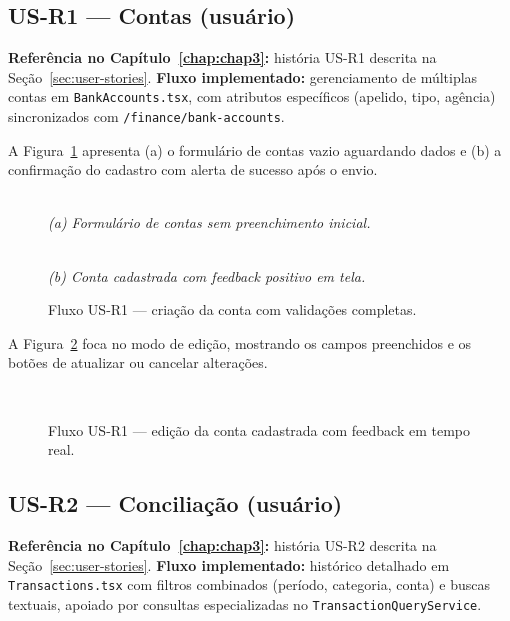 \FloatBarrier

\subsection{US-R1 — Contas (usuário)}
\textbf{Referência no Capítulo~\ref{chap:chap3}:} história US-R1 descrita na Seção~\ref{sec:user-stories}.
\textbf{Fluxo implementado:} gerenciamento de múltiplas contas em \texttt{BankAccounts.tsx}, com atributos específicos (apelido, tipo, agência) sincronizados com \texttt{/finance/bank-accounts}.

A Figura~\ref{fig:us-r1a} apresenta (a) o formulário de contas vazio aguardando dados e (b) a confirmação do cadastro com alerta de sucesso após o envio.

\begin{figure}[!htbp]
\centering
{}\\
\smallskip
\textit{(a) Formulário de contas sem preenchimento inicial.}

\par\medskip

\\
\smallskip
\textit{(b) Conta cadastrada com feedback positivo em tela.}
\caption{Fluxo US-R1 — criação da conta com validações completas.}
\label{fig:us-r1a}
\end{figure}

A Figura~\ref{fig:us-r1b} foca no modo de edição, mostrando os campos preenchidos e os botões de atualizar ou cancelar alterações.

\begin{figure}[!htbp]
\centering
{}\\
\caption{Fluxo US-R1 — edição da conta cadastrada com feedback em tempo real.}
\label{fig:us-r1b}
\end{figure}

\FloatBarrier

\subsection{US-R2 — Conciliação (usuário)}
\textbf{Referência no Capítulo~\ref{chap:chap3}:} história US-R2 descrita na Seção~\ref{sec:user-stories}.
\textbf{Fluxo implementado:} histórico detalhado em \texttt{Transactions.tsx} com filtros combinados (período, categoria, conta) e buscas textuais, apoiado por consultas especializadas no \texttt{TransactionQueryService}.


